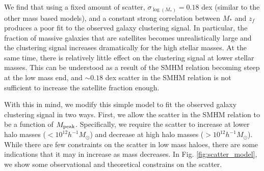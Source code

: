 \documentclass[a4paper,fleqn,usenatbib]{mnras}
\begin{document}

We find that using a fixed amount of scatter, $\sigma_{\log(M_*)} = 0.18$ dex (similar to the other mass based models), and a constant strong correlation between $M_{*}$ and $z_f$ produces a poor fit to the observed galaxy clustering signal.  In particular, the fraction of massive galaxies that are satellites becomes unrealistically large and the clustering signal increases dramatically for the high stellar masses.  At the same time, there is relatively little effect on the clustering signal at lower stellar masses.  This can be understood as a result of the SMHM relation becoming steep at the low mass end, and $\sim 0.18$ dex scatter in the SMHM relation is not sufficient to increase the satellite fraction enough.

With this in mind, we modify this simple model to fit the observed galaxy clustering signal in two ways.  First, we allow the scatter in the SMHM relation to be a function of $M_{\rm peak}$.  Specifically, we require the scatter to increase at lower halo masses ($<10^{12}h^{-1}M_{\odot}$) and decrease at high halo masses ($>10^{12}h^{-1}M_{\odot}$).  While there are few constraints on the scatter in low mass haloes, there are some indications that it may in increase as mass decreases. In Fig. \ref{fig:scatter_model}, we show some observational and theoretical constrains on the scatter.  
\end{document}
